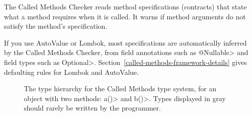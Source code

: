 
The Called Methods Checker reads method specifications (contracts) that
state what a method requires when it is called.  It warns if method
arguments do not satisfy the method's specification.

If you use AutoValue or Lombok, most specifications are automatically
inferred by the Called Methods Checker, from field annotations such as
\<@Nullable> and field types such as
\<Optional>. Section~\ref{called-methods-framework-details} gives
defaulting rules for Lombok and AutoValue.

\begin{figure}
\begin{center}
  \hfill
  \hfill
\end{center}
  \caption{The type hierarchy for the Called Methods type system, for an object with two methods: \<a()> and \<b()>.
  Types displayed in gray should rarely be written by the programmer.}
  \label{fig-called-methods-types}
\end{figure}

